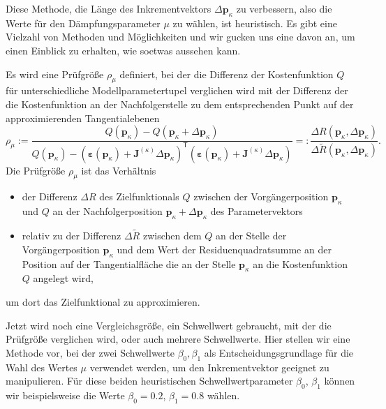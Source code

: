 Diese Methode, die  Länge des Inkrementvektors 
$\Delta \mathbf{p}_\kappa$ zu verbessern, also die Werte für den
Dämpf\-ungs\-parameter $\mu$ zu wählen, ist heuristisch.
Es gibt eine Vielzahl von Methoden und Möglichkeiten und wir gucken uns
eine davon an, um einen Einblick zu erhalten, wie soetwas aussehen kann.

Es wird eine Prüfgröße $\rho_{\mu}$ definiert, bei der die Differenz der
Kostenfunktion $Q$ für unterschiedliche Modellparametertupel 
verglichen wird mit der Differenz der die Kostenfunktion an der Nachfolgerstelle
zu dem entsprechenden Punkt auf der approximierenden Tangentialebenen
\begin{equation}
\rho_{\mu} :=\frac{Q(\mathbf{p}_\kappa) - 
Q(\mathbf{p}_\kappa + \Delta \mathbf{p}_\kappa)}
{Q(\mathbf{p}_\kappa) - 
\left( \boldsymbol \varepsilon (\mathbf{p}_\kappa) 
    + \mathbf{J}^{(\kappa)} \Delta \mathbf{p}_\kappa \right)^\mathsf{T}
\left( \boldsymbol \varepsilon (\mathbf{p}_\kappa) 
    + \mathbf{J}^{(\kappa)} \Delta \mathbf{p}_\kappa \right)  } 
=:  \frac{\Delta R(\mathbf{p}_\kappa, \Delta \mathbf{p}_\kappa)}{\Delta \tilde{R}(\mathbf{p}_\kappa, \Delta \mathbf{p}_\kappa)} .
\label{DaempfTuning}
\end{equation}
Die Prüfgröße $\rho_{\mu}$ ist das Verhältnis 
\begin{itemize}
\item der Differenz $\Delta R$ des Zielfunktionals $Q$ zwischen
der Vorgängerposition $\mathbf{p}_\kappa$ und $Q$ an der Nachfolgerposition
$\mathbf{p}_\kappa + \Delta \mathbf{p}_\kappa$
des Parametervektors 
\item relativ zu der Differenz $\Delta \tilde{R}$ zwischen dem $Q$ an der
Stelle der Vorgängerposition $\mathbf{p}_\kappa$ und dem Wert der Residuenquadratsumme
an der Position auf der Tangentialfläche die an der
Stelle $\mathbf{p}_\kappa$ an die Kostenfunktion $Q$ angelegt wird,
\end{itemize}
um dort das Zielfunktional zu approximieren.

Jetzt wird noch eine Vergleichsgröße, ein Schwellwert gebraucht, mit der die
Prüfgröße verglichen wird, oder auch mehrere Schwellwerte. Hier stellen wir
eine Methode vor, bei der zwei Schwellwerte $\beta_0, \beta_1$ als
Ent\-scheid\-ungs\-grund\-lage für die Wahl des
Wertes $\mu$ verwendet werden, um den Inkrementvektor geeignet zu manipulieren.
Für diese beiden heuristischen Schwell\-wert\-para\-meter $\beta_0$, $\beta_1$ 
können wir beispielsweise die Werte $\beta_0 = 0.2$, $\beta_1 = 0.8$ wählen.

